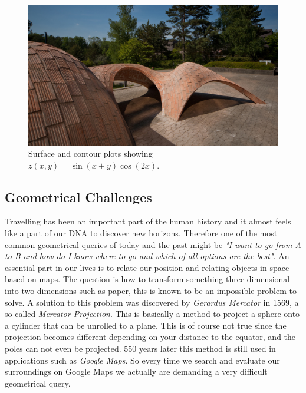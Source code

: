 \begin{figure}[H]
\centering
\includegraphics[width=0.9\linewidth ]{figure/Introduction/Block_Vault.jpg}
\caption{Surface and contour plots showing $z(x,y)=\sin(x+y)\cos(2x)$.}
\end{figure}

\subsection{Geometrical Challenges}

Travelling has been an important part of the human history and it almost feels like a part of our DNA to discover new horizons. Therefore one of the most common geometrical queries of today and the past might be \textit{"I want to go from A to B and how do I know where to go and which of all options are the best"}. An essential part in our lives is to relate our position and relating objects in space based on maps. The question is how to transform something three dimensional into two dimensions such as paper, this is known to be an impossible problem to solve. A solution to this problem was discovered by  \textit{Gerardus Mercator} in 1569, a so called \textit{Mercator Projection}. This is basically a method to project a sphere onto a cylinder that can be unrolled to a plane. This is of course not true since the projection becomes different depending on your distance to the equator, and the poles can not even be projected. 550 years later this method is still used in applications such as \textit{Google Maps}. So every time we search and evaluate our surroundings on Google Maps we actually are demanding a very difficult geometrical query. 

